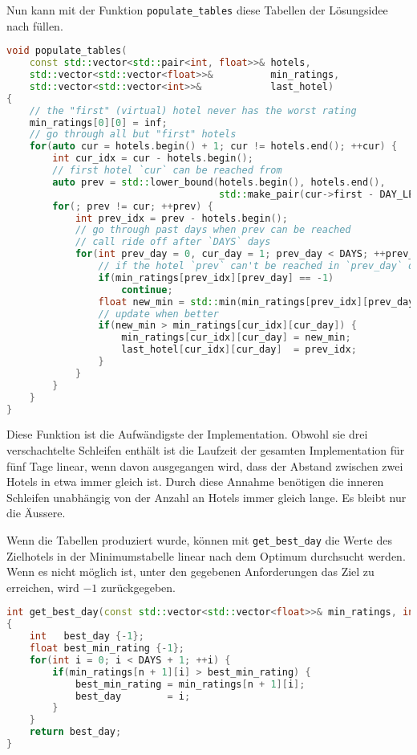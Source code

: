 \documentclass[a4paper,10pt,ngerman]{scrartcl}
\begin{document}
Nun kann mit der Funktion \lstinline{populate_tables} diese Tabellen der Lösungsidee nach füllen.
\begin{lstlisting}[language=C++]
void populate_tables(
    const std::vector<std::pair<int, float>>& hotels,
    std::vector<std::vector<float>>&          min_ratings,
    std::vector<std::vector<int>>&            last_hotel)
{
    // the "first" (virtual) hotel never has the worst rating
    min_ratings[0][0] = inf;
    // go through all but "first" hotels
    for(auto cur = hotels.begin() + 1; cur != hotels.end(); ++cur) {
        int cur_idx = cur - hotels.begin();
        // first hotel `cur` can be reached from
        auto prev = std::lower_bound(hotels.begin(), hotels.end(),
                                     std::make_pair(cur->first - DAY_LEN, .0f));
        for(; prev != cur; ++prev) {
            int prev_idx = prev - hotels.begin();
            // go through past days when prev can be reached
            // call ride off after `DAYS` days
            for(int prev_day = 0, cur_day = 1; prev_day < DAYS; ++prev_day, ++cur_day) {
                // if the hotel `prev` can't be reached in `prev_day` days
                if(min_ratings[prev_idx][prev_day] == -1)
                    continue;
                float new_min = std::min(min_ratings[prev_idx][prev_day], cur->second);
                // update when better
                if(new_min > min_ratings[cur_idx][cur_day]) {
                    min_ratings[cur_idx][cur_day] = new_min;
                    last_hotel[cur_idx][cur_day]  = prev_idx;
                }
            }
        }
    }
}
\end{lstlisting}
Diese Funktion ist die Aufwändigste der Implementation.
Obwohl sie drei verschachtelte Schleifen enthält ist die Laufzeit der gesamten Implementation für fünf Tage linear, wenn davon ausgegangen wird, dass der Abstand zwischen zwei Hotels in etwa immer gleich ist.
Durch diese Annahme benötigen die inneren Schleifen unabhängig von der Anzahl an Hotels immer gleich lange.
Es bleibt nur die Äussere.

Wenn die Tabellen produziert wurde, können mit \lstinline{get_best_day} die Werte des \glqq{}Zielhotels\grqq{} in der Minimumstabelle linear nach dem Optimum durchsucht werden.
Wenn es nicht möglich ist, unter den gegebenen Anforderungen das Ziel zu erreichen, wird $-1$ zurückgegeben.
\begin{lstlisting}[language=C++]
int get_best_day(const std::vector<std::vector<float>>& min_ratings, int n)
{
    int   best_day {-1};
    float best_min_rating {-1};
    for(int i = 0; i < DAYS + 1; ++i) {
        if(min_ratings[n + 1][i] > best_min_rating) {
            best_min_rating = min_ratings[n + 1][i];
            best_day        = i;
        }
    }
    return best_day;
}
\end{lstlisting}
\end{document}
